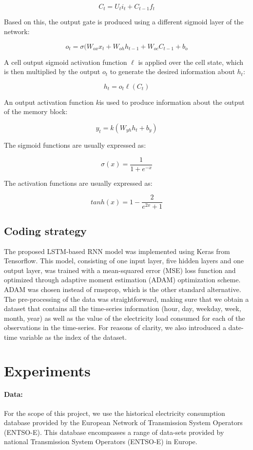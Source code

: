 \documentclass[10pt,twocolumn,letterpaper]{article}
\begin{document}
$$C_t=U_ti_t+C_{t-1}f_t $$

Based on this, the output gate is produced using a different sigmoid layer of the network:

$$o_t=\sigma(W_{ox}x_t+W_{oh}h_{t-1}+W_{oc}C_{t-1}+b_o$$

A cell output sigmoid activation function $\ell$ is applied over the cell state, which is then multiplied by the output $o_t$ to generate the desired information about $h_t$:

$$h_t=o_t \ell(C_t) $$

An output activation function $k$is used to produce information about the output of the memory block:

$$y_t=k(W_{yh}h_t+b_y)$$

The sigmoid functions are usually expressed as:

$$\sigma(x)=\frac{1}{1+e^{-x}}$$

The activation functions are usually expressed as:

$$tanh(x)=1- \frac{2}{e^{2x}+1} $$

\subsection{Coding strategy}

The proposed LSTM-based RNN model was implemented using Keras from Tensorflow. This model, consisting of one input layer, five hidden layers and one output layer, was trained with a mean-squared error (MSE) loss function and optimized through adaptive moment estimation (ADAM) optimization scheme. ADAM was chosen instead of rmsprop, which is the other standard alternative. The pre-processing of the data was straightforward, making sure that we obtain a dataset that contains all the time-series information (hour, day, weekday, week, month, year) as well as the value of the electricity load consumed for each of the observations in the time-series. For reasons of clarity, we also introduced a date-time variable as the index of the dataset.

\section{Experiments}

\paragraph{Data:} For the scope of this project, we use the historical electricity consumption database provided by the European Network of Transmission System Operators (ENTSO-E). This database encompasses a range of data-sets provided by national Transmission System Operators (ENTSO-E) in
Europe.
\end{document}
